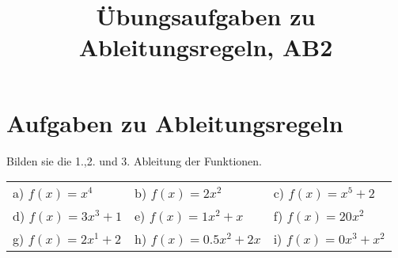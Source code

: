 \documentclass[10pt,a4paper]{article}
\begin{document}
	
\title{Übungsaufgaben zu Ableitungsregeln, AB2}

\makeatletter
\def\@maketitle{%
  \newpage
  \null
  \vskip 2em%
  \begin{center}%
  \let \footnote \thanks
    {\Huge\bfseries\@title \par}%
    \vskip 1.5em%
    {\large
      \lineskip .5em%
      \begin{tabular}[t]{c}%
        \@author
      \end{tabular}\par}%
    \vskip 1em%
    {\large \@date}%
  \end{center}%
  \par
  \vskip 1.5em}
\makeatother

\author{}
\date{}

\maketitle

\section*{Aufgaben zu Ableitungsregeln}
Bilden sie die 1.,2. und 3. Ableitung der Funktionen. \newline

\begin{tabular}{l l l}

	a) $f(x) = x^4$      & b) $f(x) = 2x^2$        & c) $f(x) = x^5 + 2$ \\
	d) $f(x) = 3x^3 + 1$ & e) $f(x) = 1x^2 + x$    & f) $f(x) = 20x^2$ \\
	g) $f(x) = 2x^1 + 2$ & h) $f(x) = 0.5x^2 + 2x$ & i) $f(x) = 0x^3 + x^2$

\end{tabular}
\end{document}
